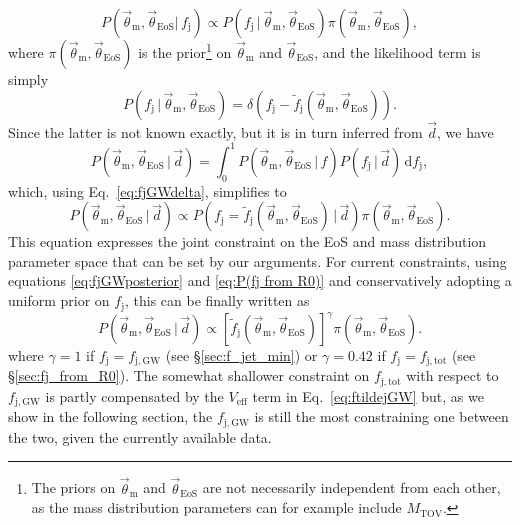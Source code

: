 \documentclass[]{aa}
\newcommand{\resp}[1]{#1}
\begin{document}
\begin{equation}
 P(\vec \theta_\mathrm{m},\vec \theta_\mathrm{EoS}|\,f_\mathrm{j})
 \propto P(f_\mathrm{j}\,|\,\vec \theta_\mathrm{m},\vec \theta_\mathrm{EoS})\pi(\vec \theta_\mathrm{m},\vec \theta_\mathrm{EoS}),
\end{equation}
where $\pi(\vec\theta_\mathrm{m},\vec \theta_\mathrm{EoS})$ is the prior\footnote{The priors on $\vec \theta_\mathrm{m}$ and $\vec \theta_\mathrm{EoS}$ are not necessarily independent from each other, as the mass distribution parameters can for example include $M_\mathrm{TOV}$.} on $\vec\theta_\mathrm{m}$ and $\vec\theta_\mathrm{EoS}$, and the likelihood term is simply 
\begin{equation}
 P(f_\mathrm{j}\,|\,\vec \theta_\mathrm{m},\vec \theta_\mathrm{EoS}) = \delta(f_\mathrm{j}-\tilde f_\mathrm{j}(\vec \theta_\mathrm{m},\vec \theta_\mathrm{EoS})).
 \label{eq:fjGWdelta}
\end{equation}
Since the latter is not known exactly, but it is in turn inferred from $\vec d$, we have
\begin{equation}\label{eq:mass_and_eos_inference}
 P(\vec \theta_\mathrm{m},\vec \theta_\mathrm{EoS}\,|\,\vec d) = \int_0^{1} P(\vec \theta_\mathrm{m},\vec \theta_\mathrm{EoS}\,|\,f)P(f_\mathrm{j}\,|\,\vec d)\,\mathrm{d}f_\mathrm{j},
\end{equation}
which, using Eq.~\ref{eq:fjGWdelta}, simplifies to
\begin{equation}
 P(\vec \theta_\mathrm{m},\vec \theta_\mathrm{EoS}\,|\,\vec d) \propto P\left(f_\mathrm{j}=\tilde f_\mathrm{j}(\vec \theta_\mathrm{m},\vec \theta_\mathrm{EoS})\,|\,\vec d\right)\pi(\vec\theta_\mathrm{m},\vec\theta_\mathrm{EoS}).
 \label{eq:P(m,EoS)_general}
\end{equation}
This equation expresses the joint constraint on the EoS and mass distribution parameter space that can be set by our arguments. For current constraints, using equations \ref{eq:fjGWposterior} and \ref{eq:P(fj from R0)} and \resp{conservatively} adopting a uniform prior on $f_\mathrm{j}$, this can be finally written as
\begin{equation}   
 P(\vec \theta_\mathrm{m},\vec \theta_\mathrm{EoS}\,|\,\vec d) \propto\left [ \tilde f_\mathrm{j}(\vec \theta_\mathrm{m},\vec \theta_\mathrm{EoS})\right ]^\gamma \pi(\vec\theta_\mathrm{m},\vec\theta_\mathrm{EoS}).
 \label{eq:P(m,EoS)} 
\end{equation}
where $\gamma=1$ if $f_\mathrm{j}=f_\mathrm{j,GW}$ (see \S\ref{sec:f_jet_min}) or $\gamma=0.42$ if $f_\mathrm{j}=f_\mathrm{j,tot}$ (see \S\ref{sec:fj_from_R0}). The somewhat shallower constraint on $f_\mathrm{j,tot}$ with respect to $f_\mathrm{j,GW}$ is partly compensated by the $V_\mathrm{eff}$ term in Eq.~\ref{eq:ftildejGW} but, as we show in the following section, the $f_\mathrm{j,GW}$ is still the most constraining one between the two, given the currently available data.
\end{document}
